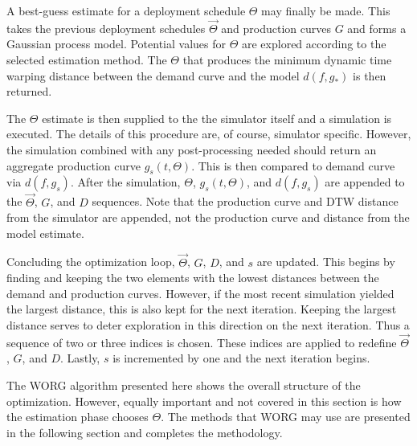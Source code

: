 A best-guess estimate for a deployment schedule $\Theta$ may finally be
made.  This takes the previous deployment schedules $\vec{\Theta}$ and
production curves $G$ and forms a Gaussian process model. Potential 
values for $\Theta$ are explored according to the selected estimation method.  The 
$\Theta$ that produces the minimum dynamic time warping distance between
the demand curve and the model $d(f, g_*)$ is then returned.

The $\Theta$ estimate is then supplied to the the simulator itself and 
a simulation is executed.  The details of this procedure are, of course,
simulator specific.  However, the simulation combined with any post-processing 
needed should return an aggregate production curve $g_s(t, \Theta)$.  
This is then compared to demand curve via $d(f, g_s)$. After the simulation, 
$\Theta$, $g_s(t, \Theta)$, and $d(f, g_s)$ are appended to the 
$\vec{\Theta}$, $G$, and $D$ sequences.  Note that the 
production curve and DTW distance from the simulator are appended, 
not the production curve and distance from the model estimate.

Concluding the optimization loop, $\vec{\Theta}$, $G$, $D$, and $s$ are
updated.  This begins by finding and keeping the two elements with the 
lowest distances between the demand and production curves.  However, 
if the most recent simulation yielded the largest distance, this is also
kept for the next iteration. Keeping the largest distance serves to deter
exploration in this direction on the next iteration.  Thus a sequence of 
two or three indices is chosen. These indices are applied to redefine
$\vec{\Theta}$, $G$, and $D$. Lastly, $s$ is incremented by one and the
next iteration begins.

The WORG algorithm presented here shows the overall structure of the 
optimization.  However, equally important and not covered in this section 
is how the
estimation phase chooses $\Theta$.  The methods that WORG may use are 
presented in the following section and completes the methodology. 
